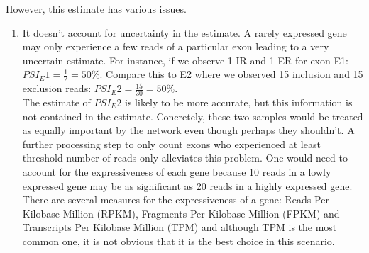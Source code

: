 However, this estimate has various issues.
\begin{enumerate}
	\item It doesn't account for uncertainty in the estimate. A rarely expressed gene may only experience a few reads of a particular exon leading to a very uncertain estimate. For instance, if we observe 1 IR and 1 ER for exon E1: $PSI_E1 = \frac{1}{2} = 50\%$. Compare this to E2 where we observed 15 inclusion and 15 exclusion reads: $PSI_E2 = \frac{15}{30} = 50\%$.\\
	The estimate of $PSI_E2$ is likely to be more accurate, but this information is not contained in the estimate. Concretely, these two samples would be treated as equally important by the network even though perhaps they shouldn't.
	A further processing step to only count exons who experienced at least threshold number of reads only alleviates this problem. One would need to account for the expressiveness of each gene because 10 reads in a lowly expressed gene may be as significant as 20 reads in a highly expressed gene. There are several measures for the expressiveness of a gene: Reads Per Kilobase Million (RPKM), Fragments Per Kilobase Million (FPKM) and Transcripts Per Kilobase Million (TPM) and although TPM is the most common one, it is not obvious that it is the best choice in this scenario.
	
	

\end{enumerate}
